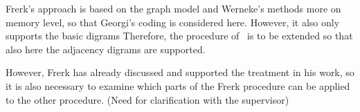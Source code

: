\documentclass[a4paper]{scrartcl}
\begin{document}
Frerk's approach is based on the graph model and Werneke's methods more on memory level, so that Georgi's coding is considered here. However, it also only supports the basic digrams
Therefore, the procedure of~\cite{werneke} is to be extended so that also here the adjacency digrams are supported.

However, Frerk has already discussed and supported the treatment in his work, so it is also necessary to examine which parts of the Frerk procedure can be applied to the other procedure. (Need for clarification with the supervisor)


\pagebreak
\printbibliography
\end{document}

